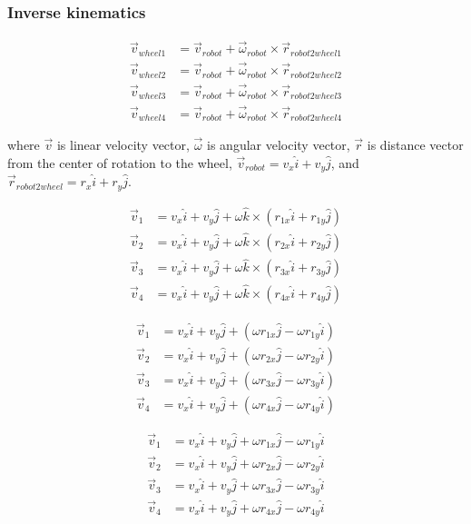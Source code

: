 \subsubsection{Inverse kinematics}

\begin{align*}
  \vec{v}_{wheel1} &= \vec{v}_{robot} + \vec{\omega}_{robot} \times
    \vec{r}_{robot2wheel1} \\
  \vec{v}_{wheel2} &= \vec{v}_{robot} + \vec{\omega}_{robot} \times
    \vec{r}_{robot2wheel2} \\
  \vec{v}_{wheel3} &= \vec{v}_{robot} + \vec{\omega}_{robot} \times
    \vec{r}_{robot2wheel3} \\
  \vec{v}_{wheel4} &= \vec{v}_{robot} + \vec{\omega}_{robot} \times
    \vec{r}_{robot2wheel4}
\end{align*}

where $\vec{v}$ is linear velocity vector, $\vec{\omega}$ is angular velocity
vector, $\vec{r}$ is distance vector from the center of rotation to the wheel,
$\vec{v}_{robot} = v_x \hat{i} + v_y \hat{j}$, and
$\vec{r}_{robot2wheel} = r_x \hat{i} + r_y \hat{j}$.

\begin{align*}
  \vec{v}_1 &= v_x \hat{i} + v_y \hat{j} + \omega \hat{k} \times
    (r_{1x} \hat{i} + r_{1y} \hat{j}) \\
  \vec{v}_2 &= v_x \hat{i} + v_y \hat{j} + \omega \hat{k} \times
    (r_{2x} \hat{i} + r_{2y} \hat{j}) \\
  \vec{v}_3 &= v_x \hat{i} + v_y \hat{j} + \omega \hat{k} \times
    (r_{3x} \hat{i} + r_{3y} \hat{j}) \\
  \vec{v}_4 &= v_x \hat{i} + v_y \hat{j} + \omega \hat{k} \times
    (r_{4x} \hat{i} + r_{4y} \hat{j})
\end{align*}

\begin{align*}
  \vec{v}_1 &= v_x \hat{i} + v_y \hat{j} +
    (\omega r_{1x} \hat{j} - \omega r_{1y} \hat{i}) \\
  \vec{v}_2 &= v_x \hat{i} + v_y \hat{j} +
    (\omega r_{2x} \hat{j} - \omega r_{2y} \hat{i}) \\
  \vec{v}_3 &= v_x \hat{i} + v_y \hat{j} +
    (\omega r_{3x} \hat{j} - \omega r_{3y} \hat{i}) \\
  \vec{v}_4 &= v_x \hat{i} + v_y \hat{j} +
    (\omega r_{4x} \hat{j} - \omega r_{4y} \hat{i})
\end{align*}

\begin{align*}
  \vec{v}_1 &= v_x \hat{i} + v_y \hat{j} +
    \omega r_{1x} \hat{j} - \omega r_{1y} \hat{i} \\
  \vec{v}_2 &= v_x \hat{i} + v_y \hat{j} +
    \omega r_{2x} \hat{j} - \omega r_{2y} \hat{i} \\
  \vec{v}_3 &= v_x \hat{i} + v_y \hat{j} +
    \omega r_{3x} \hat{j} - \omega r_{3y} \hat{i} \\
  \vec{v}_4 &= v_x \hat{i} + v_y \hat{j} +
    \omega r_{4x} \hat{j} - \omega r_{4y} \hat{i}
\end{align*}

